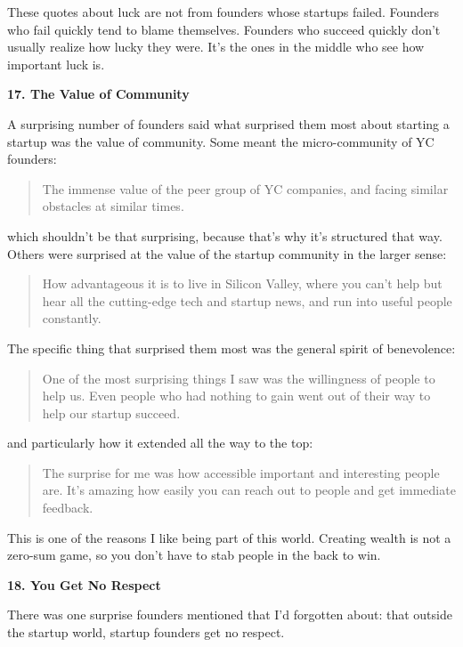 These quotes about luck are not from founders whose startups failed.
Founders who fail quickly tend to blame themselves. Founders who succeed
quickly don't usually realize how lucky they were. It's the ones in the
middle who see how important luck is.

\textbf{17. The Value of Community}

A surprising number of founders said what surprised them most about
starting a startup was the value of community. Some meant the
micro-community of YC founders:

\begin{quote}
The immense value of the peer group of YC companies, and facing similar
obstacles at similar times.
\end{quote}

which shouldn't be that surprising, because that's why it's structured
that way. Others were surprised at the value of the startup community in
the larger sense:

\begin{quote}
How advantageous it is to live in Silicon Valley, where you can't help
but hear all the cutting-edge tech and startup news, and run into useful
people constantly.
\end{quote}

The specific thing that surprised them most was the general spirit of
benevolence:

\begin{quote}
One of the most surprising things I saw was the willingness of people to
help us. Even people who had nothing to gain went out of their way to
help our startup succeed.
\end{quote}

and particularly how it extended all the way to the top:

\begin{quote}
The surprise for me was how accessible important and interesting people
are. It's amazing how easily you can reach out to people and get
immediate feedback.
\end{quote}

This is one of the reasons I like being part of this world. Creating
wealth is not a zero-sum game, so you don't have to stab people in the
back to win.

\textbf{18. You Get No Respect}

There was one surprise founders mentioned that I'd forgotten about: that
outside the startup world, startup founders get no respect.

